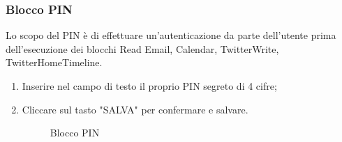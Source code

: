 \subsubsection{Blocco PIN}
Lo scopo del PIN è di effettuare un'autenticazione da parte dell'utente prima dell'esecuzione dei blocchi Read Email, Calendar, TwitterWrite, TwitterHomeTimeline.
\begin{enumerate}
	\item Inserire nel campo di testo il proprio PIN segreto di 4 cifre;
	\item Cliccare sul tasto "SALVA" per confermare e salvare.
	
	\begin{figure}[!ht]
		\centering
		\caption{Blocco PIN}
	\end{figure}
\end{enumerate}
\newpage

